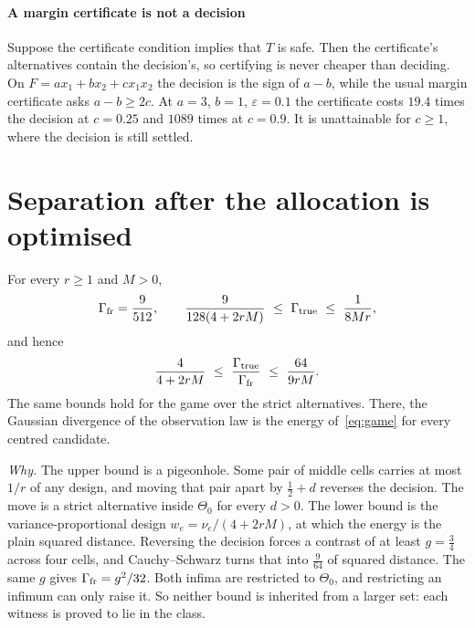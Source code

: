 \paragraph{A margin certificate is not a decision} Suppose the certificate condition implies
that $T$ is safe. Then the certificate's alternatives contain the decision's, so certifying is
never cheaper than deciding. On $F=ax_{1}+bx_{2}+cx_{1}x_{2}$ the decision is the sign of $a-b$,
while the usual margin certificate asks $a-b\ge2c$. At $a=3$, $b=1$, $\varepsilon=0.1$ the
certificate costs $19.4$ times the decision at $c=0.25$ and $1089$ times at $c=0.9$. It is
unattainable for $c\ge1$, where the decision is still settled. \NUM{}


\section{Separation after the allocation is optimised}
\label{sec:separation}

\begin{theorem}[Separation]
\label{thm:sep}
For every $r\ge1$ and $M>0$,
\[
\Gamma_{\rm fr}=\frac{9}{512},\qquad
\frac{9}{128(4+2rM)}\ \le\ \Gamma_{\rm true}\ \le\ \frac{1}{8Mr},
\]
and hence
\[
\frac{4}{4+2rM}\ \le\ \frac{\Gamma_{\rm true}}{\Gamma_{\rm fr}}\ \le\ \frac{64}{9rM}.
\]
The same bounds hold for the game over the strict alternatives. There, the Gaussian divergence
of the observation law is the energy of~\eqref{eq:game} for every centred candidate.
\end{theorem}


\emph{Why.} The upper bound is a pigeonhole. Some pair of middle cells carries at most $1/r$
of any design, and moving that pair apart by $\frac12+d$ reverses the decision. The move is a
strict alternative inside $\Theta_{0}$ for every $d>0$. The lower bound is the
variance-proportional design $w_{e}=\nu_{e}/(4+2rM)$, at which the energy is the plain squared
distance. Reversing the decision forces a contrast of at least $g=\frac34$ across four cells,
and Cauchy--Schwarz turns that into $\frac{9}{64}$ of squared distance. The same $g$ gives
$\Gamma_{\rm fr}=g^{2}/32$. Both infima are restricted to $\Theta_{0}$, and restricting an
infimum can only raise it. So neither bound is inherited from a larger set: each witness is
proved to lie in the class.

